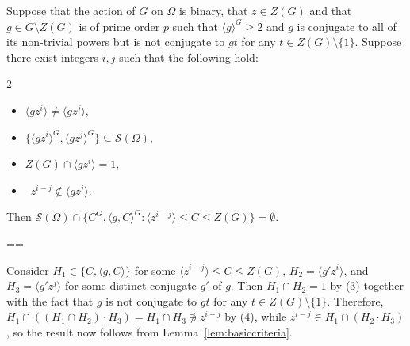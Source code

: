 \documentclass[11pt, a4paper]{amsart}
\makeatletter
\renewcommand{\proofname}{Proof}
\renewenvironment{proof}[1][\proofname]{\par
  \pushQED{\qed}  \normalfont \partopsep=\z@skip \topsep=\z@skip
  \trivlist
  \item[\hskip\labelsep
        \scshape
    #1\@addpunct{.}]\ignorespaces
}{  \popQED\endtrivlist\@endpefalse
}
\makeatother
\begin{document}
\begin{lemma}\label{lem:cycstabs}
    Suppose that the action of $G$ on $\Omega$ is binary, that $z\in Z(G)$ and that $g\in G\setminus Z(G)$ is of prime order $p$ such that $\langle g\rangle^G\geq 2$ and $g$ is conjugate to all of its non-trivial powers but is not conjugate to $gt$ for any $t\in Z(G)\setminus \{1\}$.         Suppose there exist integers $i,j$ such that the following hold:\begin{multicols}{2}\begin{itemize}\item[(1)]$\langle gz^i\rangle \ne\langle gz^j\rangle$,\item[(2)]$\{\langle gz^i\rangle^G,\langle gz^j\rangle^G\}\subseteq \mathcal{S}(\Omega)$, \item[(3)]$Z(G)\cap\langle gz^i\rangle=1$, \item[(4)]~$z^{i-j}\not\in\langle gz^j\rangle$.\end{itemize}\end{multicols} Then $\mathcal{S}(\Omega)\cap\{C^G,\langle g,C\rangle^G : \langle z^{i-j}\rangle\leq C\leq Z(G)\}=\emptyset.$
    
    
       \end{lemma}
\begin{proof}
                   Consider $H_1\in\{C,\langle g,C\rangle\}$ for some $\langle z^{i-j}\rangle\leq C\leq Z(G)$, $H_2=\langle g'z^i\rangle$, and $H_3=\langle g'z^j\rangle$ for some distinct conjugate $g'$ of $g$. Then $H_1\cap H_2=1$ by (3) together with the fact that $g$ is not conjugate to $gt$ for any $t\in Z(G)\setminus \{1\}$. Therefore, $H_1\cap((H_1\cap H_2)\cdot H_3)=H_1\cap H_3\not\ni z^{i-j}$ by (4), while $z^{i-j}\in H_1\cap (H_2\cdot H_3)$, so the result now follows from Lemma~\ref{lem:basiccriteria}.
\end{proof}
\end{document}
